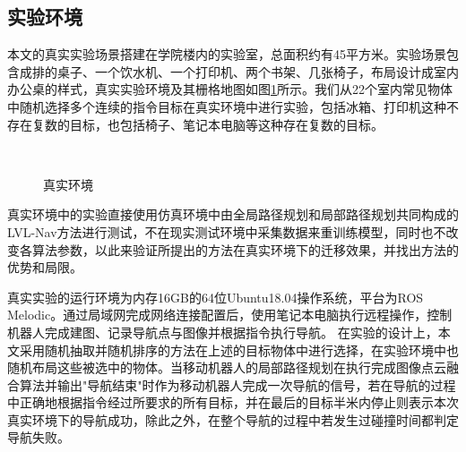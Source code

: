 \subsection{实验环境}
本文的真实实验场景搭建在学院楼内的实验室，总面积约有45平方米。实验场景包含成排的桌子、一个饮水机、一个打印机、两个书架、几张椅子，布局设计成室内办公桌的样式，真实实验环境及其栅格地图如图\ref{myrealenv}所示。我们从22个室内常见物体中随机选择多个连续的指令目标在真实环境中进行实验，包括冰箱、打印机这种不存在复数的目标，也包括椅子、笔记本电脑等这种存在复数的目标。
\begin{figure}[h]
    \centering
    \\
    \caption{真实环境}
    \label{myrealenv}
\end{figure}
真实环境中的实验直接使用仿真环境中由全局路径规划和局部路径规划共同构成的LVL-Nav方法进行测试，不在现实测试环境中采集数据来重训练模型，同时也不改变各算法参数，以此来验证所提出的方法在真实环境下的迁移效果，并找出方法的优势和局限。

真实实验的运行环境为内存16GB的64位Ubuntu18.04操作系统，平台为ROS Melodic。通过局域网完成网络连接配置后，使用笔记本电脑执行远程操作，控制机器人完成建图、记录导航点与图像并根据指令执行导航。
在实验的设计上，本文采用随机抽取并随机排序的方法在上述的目标物体中进行选择，在实验环境中也随机布局这些被选中的物体。当移动机器人的局部路径规划在执行完成图像点云融合算法并输出"导航结束"时作为移动机器人完成一次导航的信号，若在导航的过程中正确地根据指令经过所要求的所有目标，并在最后的目标半米内停止则表示本次真实环境下的导航成功，除此之外，在整个导航的过程中若发生过碰撞时间都判定导航失败。




